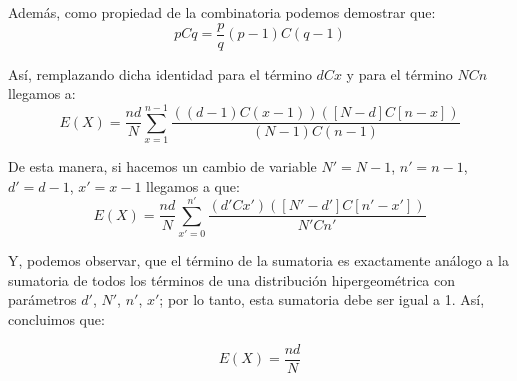 \documentclass[12pt]{article}
\begin{document}
           Además, como propiedad de la combinatoria podemos demostrar que:
           \begin{equation*}
           pCq=\frac { p }{ q } (p-1)C(q-1)
           \end{equation*}

           Así, remplazando dicha identidad para el término $dCx$ y para el término $NCn$ llegamos a:
           \begin{equation*}
           E(X)=\frac { nd }{ N } \sum _{ x=1 }^{ n-1 }{ \frac { ((d-1)C(x-1))\left( \left[ N-d \right] C\left[ n-x \right]  \right)  }{ (N-1)C(n-1) }  } 
           \end{equation*}

           De esta manera, si hacemos un cambio de variable $N'=N-1$, $n'=n-1$, $d'=d-1$, $x'=x-1$ llegamos a que:
           \begin{equation*}
           E(X)=\frac { nd }{ N } \sum _{ x'=0 }^{ n' }{ \frac { (d'Cx')\left( \left[ N'-d' \right] C\left[ n'-x' \right]  \right)  }{ N'Cn' }  } 
           \end{equation*}

           Y, podemos observar, que el término de la sumatoria es exactamente análogo a la sumatoria de todos los términos de una distribución hipergeométrica con parámetros $d'$, $N'$, $n'$, $x'$; por lo tanto, esta sumatoria debe ser igual a 1. Así, concluimos que:

           \begin{equation*}
           E(X)=\frac { nd }{ N } 
           \end{equation*}
            
\end{document}

